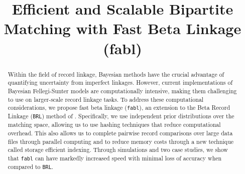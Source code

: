 \documentclass[ba]{imsart}
\begin{document}
\linenumbers
\begin{frontmatter}
\title{Efficient and Scalable Bipartite Matching with Fast Beta Linkage  (fabl)}


\begin{abstract}
Within the field of record linkage, Bayesian methods have the crucial advantage of quantifying uncertainty from imperfect linkages. However, current implementations of Bayesian Fellegi-Sunter models are computationally intensive, making them challenging to use on larger-scale record linkage tasks. To address these computational considerations, we propose fast beta linkage (\texttt{fabl}), an extension to the Beta Record Linkage (\texttt{BRL}) method of \cite{sadinle_bayesian_2017}. Specifically, we use independent prior distributions over the matching space, allowing us to use hashing techniques that reduce computational overhead. This also allows us to complete pairwise record comparisons over large data files through parallel computing and to reduce memory costs through a new technique called storage efficient indexing. Through simulations and two case studies, we show that \texttt{fabl} can have markedly increased speed with minimal loss of accuracy when compared to \texttt{BRL}.
%


\end{abstract}
\end{frontmatter}
\end{document}

